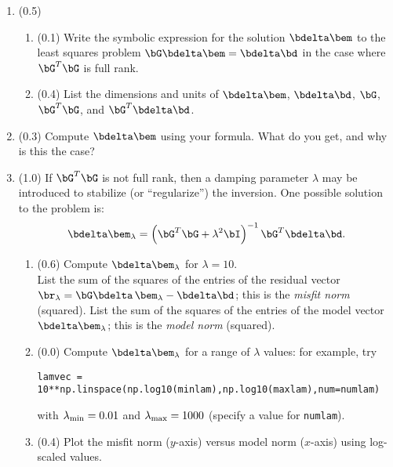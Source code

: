 \documentclass[11pt,titlepage,fleqn]{article}
\begin{document}
\begin{enumerate}
\item (0.5)
\begin{enumerate}
\item (0.1) Write the symbolic expression for the solution $\bdelta\bem$ to the least squares problem $\bG\bdelta\bem=\bdelta\bd$ in the case where $\bG^T\bG$ is full rank.

\item (0.4) List the dimensions and units of $\bdelta\bem$, $\bdelta\bd$, $\bG$, $\bG^T\bG$, and $\bG^T\bdelta\bd$.
\end{enumerate}


\item (0.3) Compute $\bdelta\bem$ using your formula.  What do you get, and why is this the case?


\item (1.0) If $\bG^T\bG$ is not full rank, then a damping parameter $\lambda$ may be introduced to stabilize (or ``regularize'') the inversion.  One possible solution to the problem is:
%
\begin{equation}
\bdelta\bem_{\lambda} = \left(\bG^T\bG+\lambda^2\bI\right)^{-1}\bG^T\bdelta\bd.
\end{equation}
%
\begin{enumerate}

\item (0.6) Compute $\bdelta\bem_{\lambda}$ for $\lambda = 10$. \\
List the sum of the squares of the entries of the residual vector $\br_\lambda = \bG\bdelta\,\bem_\lambda-\bdelta\bd$; this is the {\em misfit norm} (squared).
List the sum of the squares of the entries of the model vector $\bdelta\bem_{\lambda}$; this is the {\em model norm} (squared).


\item (0.0) Compute $\bdelta\bem_{\lambda}$ for a range of $\lambda$ values: for example, try

\verb+lamvec = 10**np.linspace(np.log10(minlam),np.log10(maxlam),num=numlam)+

with $\lambda_{\rm min} = 0.01$ and $\lambda_{\rm max} = 1000$ (specify a value for \verb+numlam+).


\item (0.4) Plot the misfit norm ($y$-axis) versus model norm ($x$-axis) using log-scaled values.


\end{enumerate}
\end{enumerate}
\end{document}
